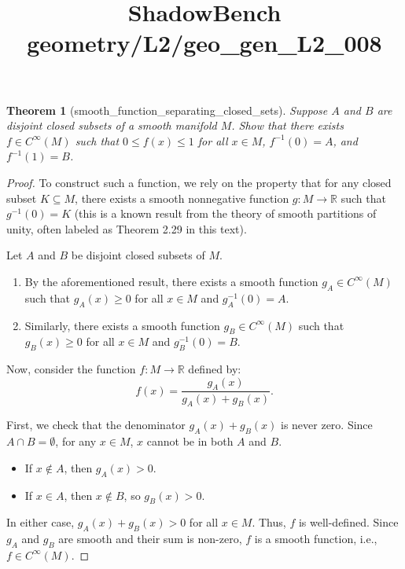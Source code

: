\documentclass{article}
\title{ShadowBench geometry/L2/geo\_gen\_L2\_008}
\newtheorem{theorem}{Theorem}
\begin{document}
\maketitle

\begin{theorem}[smooth_function_separating_closed_sets]
Suppose $A$ and $B$ are disjoint closed subsets of a smooth manifold $M$. Show that there exists $f \in C^\infty(M)$ such that $0 \le f(x) \le 1$ for all $x \in M$, $f^{-1}(0) = A$, and $f^{-1}(1) = B$.
\end{theorem}

\begin{proof}
To construct such a function, we rely on the property that for any closed subset $K \subseteq M$, there exists a smooth nonnegative function $g: M \to \mathbb{R}$ such that $g^{-1}(0) = K$ (this is a known result from the theory of smooth partitions of unity, often labeled as Theorem 2.29 in this text).

Let $A$ and $B$ be disjoint closed subsets of $M$.
\begin{enumerate}
    \item By the aforementioned result, there exists a smooth function $g_A \in C^\infty(M)$ such that $g_A(x) \ge 0$ for all $x \in M$ and $g_A^{-1}(0) = A$.
    \item Similarly, there exists a smooth function $g_B \in C^\infty(M)$ such that $g_B(x) \ge 0$ for all $x \in M$ and $g_B^{-1}(0) = B$.
\end{enumerate}

Now, consider the function $f: M \to \mathbb{R}$ defined by:
\[
f(x) = \frac{g_A(x)}{g_A(x) + g_B(x)}.
\]

First, we check that the denominator $g_A(x) + g_B(x)$ is never zero. Since $A \cap B = \emptyset$, for any $x \in M$, $x$ cannot be in both $A$ and $B$. 
\begin{itemize}
    \item If $x \notin A$, then $g_A(x) > 0$.
    \item If $x \in A$, then $x \notin B$, so $g_B(x) > 0$.
\end{itemize}
In either case, $g_A(x) + g_B(x) > 0$ for all $x \in M$. Thus, $f$ is well-defined. Since $g_A$ and $g_B$ are smooth and their sum is non-zero, $f$ is a smooth function, i.e., $f \in C^\infty(M)$.


\end{proof}
\end{document}
